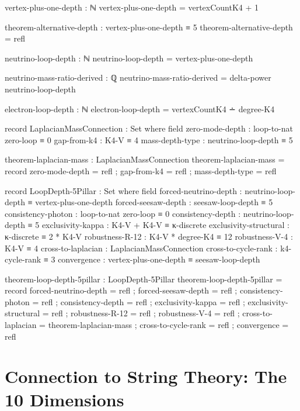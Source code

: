 \documentclass[11pt,a4paper]{book}
\begin{document}
\begin{code}
vertex-plus-one-depth : ℕ
vertex-plus-one-depth = vertexCountK4 + 1

theorem-alternative-depth : vertex-plus-one-depth ≡ 5
theorem-alternative-depth = refl

neutrino-loop-depth : ℕ
neutrino-loop-depth = vertex-plus-one-depth

neutrino-mass-ratio-derived : ℚ
neutrino-mass-ratio-derived = delta-power neutrino-loop-depth

electron-loop-depth : ℕ
electron-loop-depth = vertexCountK4 ∸ degree-K4

record LaplacianMassConnection : Set where
  field
    zero-mode-depth : loop-to-nat zero-loop ≡ 0
    gap-from-k4 : K4-V ≡ 4
    mass-depth-type : neutrino-loop-depth ≡ 5

theorem-laplacian-mass : LaplacianMassConnection
theorem-laplacian-mass = record
  { zero-mode-depth = refl
  ; gap-from-k4 = refl
  ; mass-depth-type = refl
  }
\end{code}

\begin{code}
record LoopDepth-5Pillar : Set where
  field
    forced-neutrino-depth : neutrino-loop-depth ≡ vertex-plus-one-depth
    forced-seesaw-depth   : seesaw-loop-depth ≡ 5
    consistency-photon    : loop-to-nat zero-loop ≡ 0
    consistency-depth     : neutrino-loop-depth ≡ 5
    exclusivity-kappa      : K4-V + K4-V ≡ κ-discrete
    exclusivity-structural : κ-discrete ≡ 2 * K4-V
    robustness-R-12       : K4-V * degree-K4 ≡ 12
    robustness-V-4        : K4-V ≡ 4
    cross-to-laplacian    : LaplacianMassConnection
    cross-to-cycle-rank   : k4-cycle-rank ≡ 3
    convergence           : vertex-plus-one-depth ≡ seesaw-loop-depth

theorem-loop-depth-5pillar : LoopDepth-5Pillar
theorem-loop-depth-5pillar = record
  { forced-neutrino-depth = refl
  ; forced-seesaw-depth   = refl
  ; consistency-photon    = refl
  ; consistency-depth     = refl
  ; exclusivity-kappa     = refl
  ; exclusivity-structural = refl
  ; robustness-R-12       = refl
  ; robustness-V-4        = refl
  ; cross-to-laplacian    = theorem-laplacian-mass
  ; cross-to-cycle-rank   = refl
  ; convergence           = refl
  }
\end{code}

\section{Connection to String Theory: The 10 Dimensions}
\end{document}
